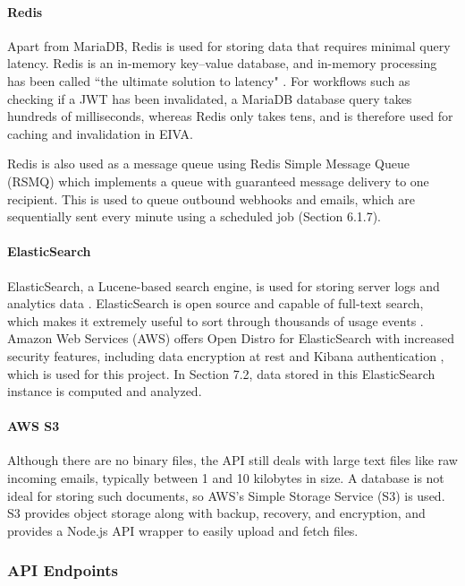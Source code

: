 \documentclass{article}
\begin{document}
\paragraph{Redis}

Apart from MariaDB, Redis is used for storing data that requires minimal query latency. Redis is an in-memory key–value database, and in-memory processing has been called ``the ultimate solution to latency" \cite{alami_supply_2018}. For workflows such as checking if a JWT has been invalidated, a MariaDB database query takes hundreds of milliseconds, whereas Redis only takes tens, and is therefore used for caching and invalidation in EIVA.

Redis is also used as a message queue using Redis Simple Message Queue (RSMQ) which implements a queue with guaranteed message delivery to one recipient. This is used to queue outbound webhooks and emails, which are sequentially sent every minute using a scheduled job (Section 6.1.7).

\paragraph{ElasticSearch}

ElasticSearch, a Lucene-based search engine, is used for storing server logs and analytics data \cite{noauthor_elastic_nodate}. ElasticSearch is open source and capable of full-text search, which makes it extremely useful to sort through thousands of usage events \cite{noauthor_elastic/elasticsearch_2020}. Amazon Web Services (AWS) offers Open Distro for ElasticSearch with increased security features, including data encryption at rest and Kibana authentication \cite{noauthor_open_nodate}, which is used for this project. In Section 7.2, data stored in this ElasticSearch instance is computed and analyzed.

\paragraph{AWS S3}

Although there are no binary files, the API still deals with large text files like raw incoming emails, typically between 1 and 10 kilobytes in size. A database is not ideal for storing such documents, so AWS's Simple Storage Service (S3) is used. S3 provides object storage along with backup, recovery, and encryption, and provides a Node.js API wrapper to easily upload and fetch files.

\subsubsection{API Endpoints}
\end{document}
